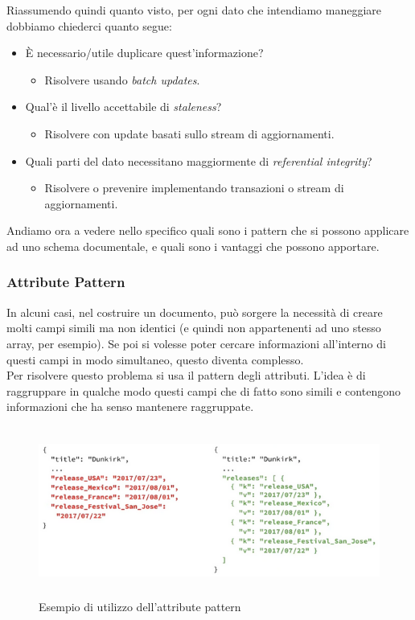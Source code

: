 \noindent Riassumendo quindi quanto visto, per ogni dato che intendiamo maneggiare dobbiamo chiederci quanto segue:
\begin{itemize}
    \item È necessario/utile duplicare quest'informazione?
    \begin{itemize}
        \item Risolvere usando \textit{batch updates}.
    \end{itemize}
    \item Qual'è il livello accettabile di \textit{staleness}?
    \begin{itemize}
        \item Risolvere con update basati sullo \gls{stream di aggiornamenti}.
    \end{itemize}
    \item Quali parti del dato necessitano maggiormente di \textit{referential integrity}?
    \begin{itemize}
        \item Risolvere o prevenire implementando transazioni o \gls{stream di aggiornamenti}.
    \end{itemize}
\end{itemize}

\noindent Andiamo ora a vedere nello specifico quali sono i pattern che si possono applicare ad uno schema documentale, e quali sono i vantaggi che possono apportare.

\subsubsection{Attribute Pattern}
In alcuni casi, nel costruire un documento, può sorgere la necessità di creare molti campi simili ma non identici (e quindi non appartenenti ad uno stesso array, per esempio). Se poi si volesse poter cercare informazioni all'interno di questi campi in modo simultaneo, questo diventa complesso.\\
Per risolvere questo problema si usa il pattern degli attributi. L'idea è di raggruppare in qualche modo questi campi che di fatto sono simili e contengono informazioni che ha senso mantenere raggruppate.\\

\begin{figure}[htbp]
\begin{center}
\includegraphics[height=15em]{immagini/attribute-pattern.png}
\caption{Esempio di utilizzo dell'attribute pattern}
\end{center}
\end{figure}


